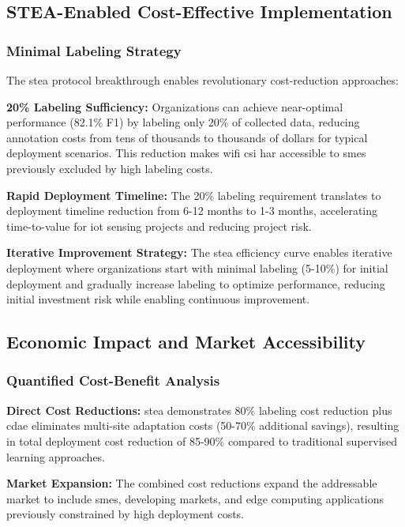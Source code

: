 \documentclass[journal]{IEEEtran}
\begin{document}
\subsection{STEA-Enabled Cost-Effective Implementation}

\subsubsection{Minimal Labeling Strategy}

The \gls{stea} protocol breakthrough enables revolutionary cost-reduction approaches:

\textbf{20\% Labeling Sufficiency:} Organizations can achieve near-optimal performance (82.1\% F1) by labeling only 20\% of collected data, reducing annotation costs from tens of thousands to thousands of dollars for typical deployment scenarios. This reduction makes \gls{wifi} \gls{csi} \gls{har} accessible to \glspl{sme} previously excluded by high labeling costs.

\textbf{Rapid Deployment Timeline:} The 20\% labeling requirement translates to deployment timeline reduction from 6-12 months to 1-3 months, accelerating time-to-value for \gls{iot} sensing projects and reducing project risk.

\textbf{Iterative Improvement Strategy:} The \gls{stea} efficiency curve enables iterative deployment where organizations start with minimal labeling (5-10\%) for initial deployment and gradually increase labeling to optimize performance, reducing initial investment risk while enabling continuous improvement.

\subsection{Economic Impact and Market Accessibility}

\subsubsection{Quantified Cost-Benefit Analysis}

\textbf{Direct Cost Reductions:} \gls{stea} demonstrates 80\% labeling cost reduction plus \gls{cdae} eliminates multi-site adaptation costs (50-70\% additional savings), resulting in total deployment cost reduction of 85-90\% compared to traditional supervised learning approaches.

\textbf{Market Expansion:} The combined cost reductions expand the addressable market to include \glspl{sme}, developing markets, and edge computing applications previously constrained by high deployment costs.
\end{document}
